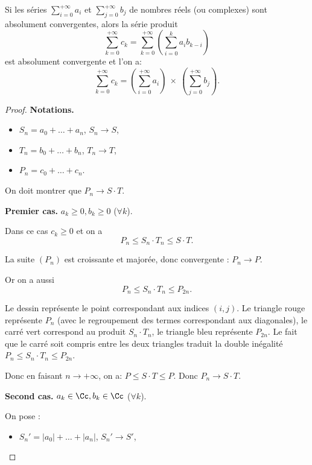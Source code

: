 \documentclass[class=report,crop=false]{standalone}
\begin{document}
\begin{theoreme}
Si les séries $\sum_{i=0}^{+\infty} a_i$ et $\sum_{j=0}^{+\infty} b_j$ de nombres réels (ou complexes)
sont absolument convergentes, alors la série produit 
$$\sum_{k=0}^{+\infty} c_k = \sum_{k=0}^{+\infty} \left(\sum_{i=0}^k a_ib_{k-i}\right)$$
est absolument convergente et l'on a:
$$\sum_{k=0}^{+\infty} c_k = \left(\sum_{i=0}^{+\infty} a_i\right)\ \times\ \left(\sum_{j=0}^{+\infty} b_j\right).$$
\end{theoreme}

\begin{proof}
\textbf{Notations.}

\begin{itemize}
  \item $S_n=a_0+\dots+a_n$, $S_n\to S$,
  
  \item $T_n=b_0+\dots +b_n$, $T_n\to T$,
  
  \item $P_n= c_0+\dots+c_n$.
\end{itemize}

On doit montrer que $P_n \to S\cdot T$.

\medskip
\textbf{Premier cas.} $a_k\ge 0, b_k \ge 0$ ($\forall k$). 

Dans ce cas $c_k\ge 0$ et on a 
$$P_n \le S_n \cdot T_n\le S \cdot T.$$ 

La suite $(P_n)$ est croissante et majorée, donc convergente : $P_n\to P$.

Or on a aussi 
$$P_n \le S_n \cdot T_n \le P_{2n}.$$

Le dessin représente le point correspondant aux indices $(i,j)$.
Le triangle rouge représente  $P_n$ (avec le regroupement des termes correspondant aux diagonales),
le carré vert correspond au produit $S_n \cdot T_n$,
le triangle bleu représente  $P_{2n}$. Le fait que le carré soit compris entre les deux triangles
traduit la double inégalité $P_n \le S_n \cdot T_n \le P_{2n}$.

\medskip

Donc en faisant $n\to+\infty$, on a: $P\le S \cdot T\le P$. Donc $P_n\to S \cdot T$.

\medskip
\textbf{Second cas.} $a_k\in\Cc, b_k \in \Cc$ ($\forall k$).

On pose :
\begin{itemize}
  \item $S_n'=|a_0|+\dots+|a_n|$, $S_n'\to S'$,
  

\end{itemize}
\end{proof}
\end{document}
